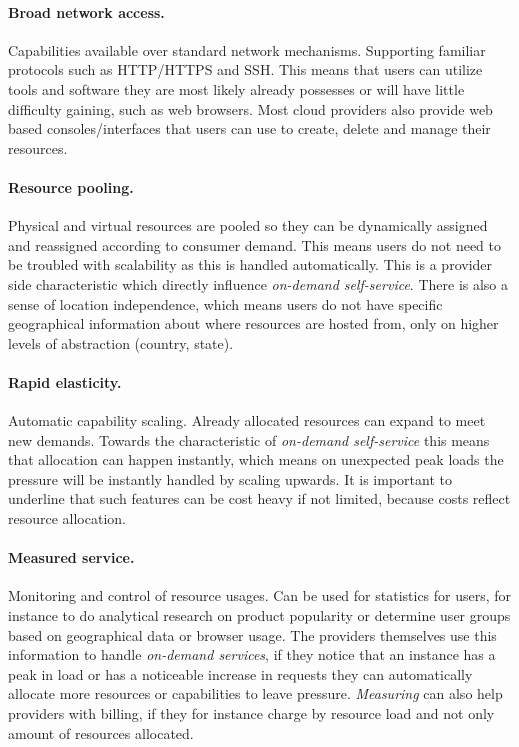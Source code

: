 \paragraph{Broad network access.}

Capabilities available over standard network mechanisms.
Supporting familiar protocols such as HTTP/HTTPS and SSH.
This means that users can utilize tools and software they are most likely already possesses
or will have little difficulty gaining, such as web browsers.
Most cloud providers also provide web based consoles/interfaces that users can use
to create, delete and manage their resources.

\paragraph{Resource pooling.}

Physical and virtual resources are pooled so they can be 
dynamically assigned and reassigned according to consumer demand.
This means users do not need to be troubled with scalability as this is handled automatically.
This is a provider side characteristic which directly influence \emph{on-demand self-service}.
There is also a sense of location independence, which means users do not have specific geographical
information about where resources are hosted from, only on higher levels of abstraction (country, state).

\paragraph{Rapid elasticity.}

Automatic capability scaling.
Already allocated resources can expand to meet new demands.
Towards the characteristic of \emph{on-demand self-service} this means that allocation
can happen instantly, which means on unexpected peak loads the pressure will be
instantly handled by scaling upwards.
It is important to underline that such features can be cost heavy if not limited,
because costs reflect resource allocation.
\paragraph{Measured service.}

Monitoring and control of resource usages.
Can be used for statistics for users, for instance to do analytical research on product popularity
or determine user groups based on geographical data or browser usage.
The providers themselves use this information to handle \emph{on-demand services},
if they notice that an instance has a peak in load or has a noticeable increase 
in requests they can automatically allocate more resources or capabilities 
to leave pressure.
\emph{Measuring} can also help providers with billing, if they for instance
charge by resource load and not only amount of resources allocated.

